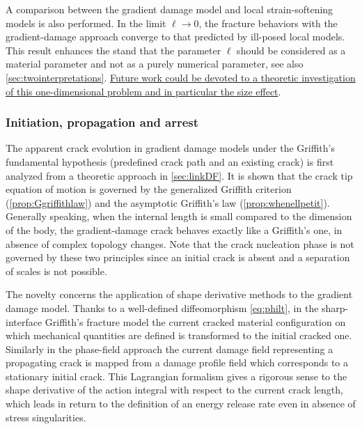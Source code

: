 A comparison between the gradient damage model and local strain-softening models is also performed. In the limit $\ell\to 0$, the fracture behaviors with the gradient-damage approach converge to that predicted by ill-posed local models. This result enhances the stand that the parameter $\ell$ should be considered as a material parameter and not as a purely numerical parameter, see also \cref{sec:twointerpretations}. \uline{Future work could be devoted to a theoretic investigation of this one-dimensional problem and in particular the size effect}.

\subsubsection{Initiation, propagation and arrest}
The apparent crack evolution in gradient damage models under the Griffith's fundamental hypothesis (predefined crack path and an existing crack) is first analyzed from a theoretic approach in \cref{sec:linkDF}. It is shown that the crack tip equation of motion is governed by the generalized Griffith criterion (\cref{prop:Ggriffithlaw}) and the asymptotic Griffith's law (\cref{prop:whenellpetit}). Generally speaking, when the internal length is small compared to the dimension of the body, the gradient-damage crack behaves exactly like a Griffith's one, in absence of complex topology changes. Note that the crack nucleation phase is not governed by these two principles since an initial crack is absent and a separation of scales is not possible.

The novelty concerns the application of shape derivative methods \cite{Destuynder:1981} to the gradient damage model. Thanks to a well-defined diffeomorphism \eqref{eq:philt}, in the sharp-interface Griffith's fracture model the current cracked material configuration on which mechanical quantities are defined is transformed to the initial cracked one. Similarly in the phase-field approach the current damage field representing a propagating crack is mapped from a damage profile field which corresponds to a stationary initial crack. This Lagrangian formalism gives a rigorous sense to the shape derivative of the action integral with respect to the current crack length, which leads in return to the definition of an energy release rate even in absence of stress singularities.

